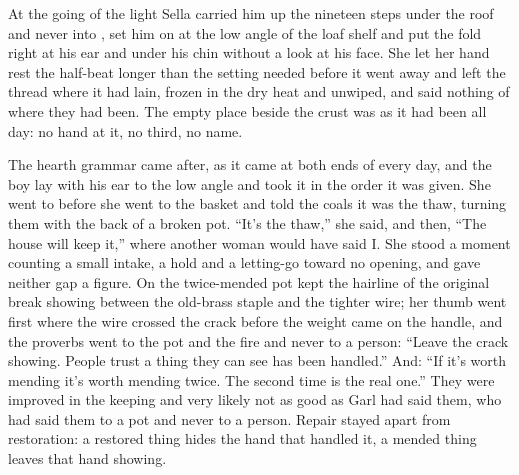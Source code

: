 \scenebreak

At the going of the light Sella carried him up the nineteen steps under the roof and never into , set him on  at the low angle of the loaf shelf and put the fold right at his ear and under his chin without a look at his face. She let her hand rest the half-beat longer than the setting needed before it went away and left the thread where it had lain, frozen in the dry heat and unwiped, and said nothing of where they had been. The empty place beside the crust was as it had been all day: no hand at it, no third, no name.

The hearth grammar came after, as it came at both ends of every day, and the boy lay with his ear to the low angle and took it in the order it was given. She went to  before she went to the basket and told the coals it was the thaw, turning them with the back of a broken pot. “It's the thaw,” she said, and then, “The house will keep it,” where another woman would have said I. She stood a moment counting a small intake, a hold and a letting-go toward no opening, and gave neither gap a figure. On  the twice-mended pot kept the hairline of the original break showing between the old-brass staple and the tighter wire; her thumb went first where the wire crossed the crack before the weight came on the handle, and the proverbs went to the pot and the fire and never to a person: “Leave the crack showing. People trust a thing they can see has been handled.” And: “If it's worth mending it's worth mending twice. The second time is the real one.” They were improved in the keeping and very likely not as good as Garl had said them, who had said them to a pot and never to a person. Repair stayed apart from restoration: a restored thing hides the hand that handled it, a mended thing leaves that hand showing.

